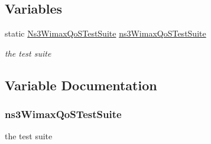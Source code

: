 \subsection*{Variables}
\begin{DoxyCompactItemize}
\item 
static \hyperlink{classNs3WimaxQoSTestSuite}{Ns3\+Wimax\+Qo\+S\+Test\+Suite} \hyperlink{qos-test_8cc_a632c33d43e6fec18da407648325ccf3a}{ns3\+Wimax\+Qo\+S\+Test\+Suite}
\begin{DoxyCompactList}\small\item\em the test suite \end{DoxyCompactList}\end{DoxyCompactItemize}


\subsection{Variable Documentation}
\subsubsection[{\texorpdfstring{ns3\+Wimax\+Qo\+S\+Test\+Suite}{ns3WimaxQoSTestSuite}}]{ ns3\+Wimax\+Qo\+S\+Test\+Suite\hspace{0.3cm}{\ttfamily [static]}}\hypertarget{qos-test_8cc_a632c33d43e6fec18da407648325ccf3a}{}\label{qos-test_8cc_a632c33d43e6fec18da407648325ccf3a}


the test suite 

